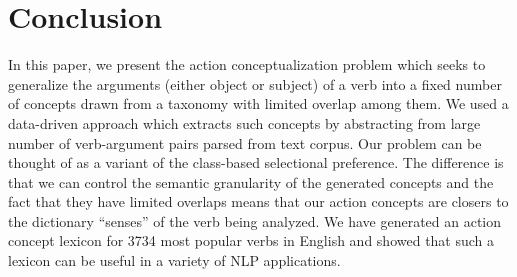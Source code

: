 \section{Conclusion}
\label{sec:conclude}
In this paper, we present the action conceptualization problem 
which seeks to generalize the arguments (either object or subject) 
of a verb into a fixed number of concepts drawn from 
a taxonomy with limited overlap among them. 
We used a data-driven approach which extracts
such concepts by abstracting from large number of verb-argument
pairs parsed from text corpus. Our problem can be thought of as a
variant of the class-based selectional preference. The difference
is that we can control the semantic granularity of the 
generated concepts and the fact that they have limited overlaps
means that our action concepts are closers to the dictionary
``senses'' of the verb being analyzed.
We have generated an action concept lexicon for 
3734 most popular verbs in English and showed that 
such a lexicon can be useful in a variety of NLP applications.
%

